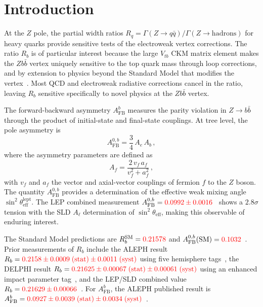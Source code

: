 \documentclass[11pt,a4paper]{article}
\newcommand{\external}[1]{\textcolor{red}{#1}}
\begin{document}
\clearpage

\section{Introduction}
\label{sec:intro}

At the $Z$ pole, the partial width ratios $R_q = \Gamma(Z \to q\bar{q}) /
\Gamma(Z \to \mathrm{hadrons})$ for heavy quarks provide sensitive tests of
the electroweak vertex corrections.  The ratio $R_b$ is of particular
interest because the large $V_{tb}$ CKM matrix element makes the $Zb\bar{b}$
vertex uniquely sensitive to the top quark mass through loop corrections,
and by extension to physics beyond the Standard Model that modifies the
vertex~\cite{ALEPH:Rb:1996, LEP:EWWG:2005}.  Most QCD and electroweak
radiative corrections cancel in the ratio, leaving $R_b$ sensitive
specifically to novel physics at the $Zb\bar{b}$ vertex.

The forward-backward asymmetry $A_\mathrm{FB}^b$ measures the parity
violation in $Z \to b\bar{b}$ through the product of initial-state and
final-state couplings.  At tree level, the pole asymmetry is
\begin{equation}
  A_\mathrm{FB}^{0,b} = \frac{3}{4}\, A_e \, A_b\,,
  \label{eq:afb0b}
\end{equation}
where the asymmetry parameters are defined as
\begin{equation}
  A_f = \frac{2\, v_f \, a_f}{v_f^2 + a_f^2}\,,
  \label{eq:Af}
\end{equation}
with $v_f$ and $a_f$ the vector and axial-vector couplings of fermion $f$
to the $Z$ boson.  The quantity $A_\mathrm{FB}^{0,b}$ provides a
determination of the effective weak mixing angle $\sin^2\theta_\mathrm{eff}^{\mathrm{lept}}$.
The LEP combined measurement $A_\mathrm{FB}^{0,b} =
\external{0.0992 \pm 0.0016}$~\cite{LEP:EWWG:2005} shows a $2.8\sigma$
tension with the SLD $A_\ell$ determination of $\sin^2\theta_\mathrm{eff}$,
making this observable of enduring interest.

The Standard Model predictions are $R_b^\mathrm{SM} = \external{0.21578}$
and $A_\mathrm{FB}^{0,b}(\mathrm{SM}) = \external{0.1032}$~\cite{LEP:EWWG:2005}.
Prior measurements of $R_b$ include the ALEPH result
$R_b = \external{0.2158 \pm 0.0009\;\mathrm{(stat)} \pm 0.0011\;\mathrm{(syst)}}$
using five hemisphere tags~\cite{ALEPH:Rb:1996}, the DELPHI result
$R_b = \external{0.21625 \pm 0.00067\;\mathrm{(stat)} \pm 0.00061\;\mathrm{(syst)}}$
using an enhanced impact parameter tag~\cite{DELPHI:Rb}, and the LEP/SLD
combined value $R_b = \external{0.21629 \pm 0.00066}$~\cite{LEP:EWWG:2005}.
For $A_\mathrm{FB}^b$, the ALEPH published result is
$A_\mathrm{FB}^b = \external{0.0927 \pm 0.0039\;\mathrm{(stat)} \pm 0.0034\;\mathrm{(syst)}}$~\cite{ALEPH:AFBb}.
\end{document}
